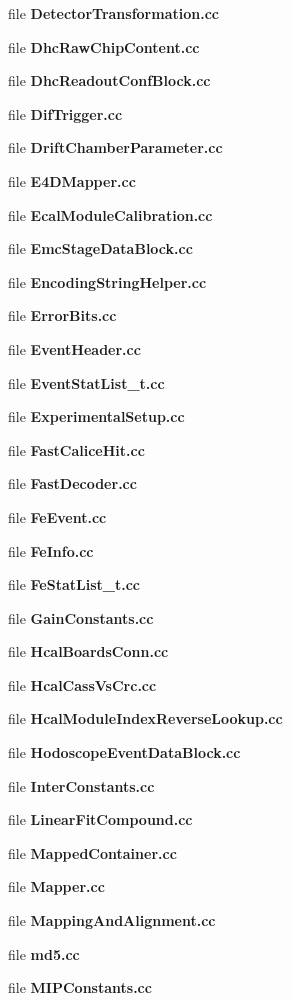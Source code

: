 \begin{DoxyCompactItemize}
file {\bfseries Detector\-Transformation.\-cc}
\item 
file {\bfseries Dhc\-Raw\-Chip\-Content.\-cc}
\item 
file {\bfseries Dhc\-Readout\-Conf\-Block.\-cc}
\item 
file {\bfseries Dif\-Trigger.\-cc}
\item 
file {\bfseries Drift\-Chamber\-Parameter.\-cc}
\item 
file {\bfseries E4\-D\-Mapper.\-cc}
\item 
file {\bfseries Ecal\-Module\-Calibration.\-cc}
\item 
file {\bfseries Emc\-Stage\-Data\-Block.\-cc}
\item 
file {\bfseries Encoding\-String\-Helper.\-cc}
\item 
file {\bfseries Error\-Bits.\-cc}
\item 
file {\bfseries Event\-Header.\-cc}
\item 
file {\bfseries Event\-Stat\-List\-\_\-t.\-cc}
\item 
file {\bfseries Experimental\-Setup.\-cc}
\item 
file {\bfseries Fast\-Calice\-Hit.\-cc}
\item 
file {\bfseries Fast\-Decoder.\-cc}
\item 
file {\bfseries Fe\-Event.\-cc}
\item 
file {\bfseries Fe\-Info.\-cc}
\item 
file {\bfseries Fe\-Stat\-List\-\_\-t.\-cc}
\item 
file {\bfseries Gain\-Constants.\-cc}
\item 
file {\bfseries Hcal\-Boards\-Conn.\-cc}
\item 
file {\bfseries Hcal\-Cass\-Vs\-Crc.\-cc}
\item 
file {\bfseries Hcal\-Module\-Index\-Reverse\-Lookup.\-cc}
\item 
file {\bfseries Hodoscope\-Event\-Data\-Block.\-cc}
\item 
file {\bfseries Inter\-Constants.\-cc}
\item 
file {\bfseries Linear\-Fit\-Compound.\-cc}
\item 
file {\bfseries Mapped\-Container.\-cc}
\item 
file {\bfseries Mapper.\-cc}
\item 
file {\bfseries Mapping\-And\-Alignment.\-cc}
\item 
file {\bfseries md5.\-cc}
\item 
file {\bfseries M\-I\-P\-Constants.\-cc}

\end{DoxyCompactItemize}
